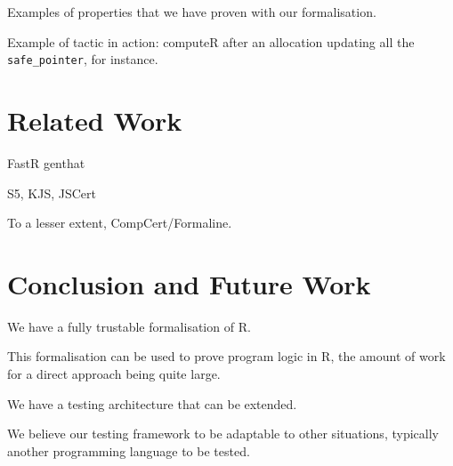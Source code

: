 \documentclass[
    sigplan,
    10pt,
    review, %
    natbib=false %
 ]{acmart}
\begin{document}
Examples of properties that we have proven with our formalisation.

Example of tactic in action:
computeR after an allocation updating all the \verb|safe_pointer|, for instance.

\section{Related Work}
\label{sec:related:work}

FastR
genthat

S5, KJS, JSCert

To a lesser extent, CompCert/Formaline.

\section{Conclusion and Future Work}
\label{sec:conclusion}

We have a fully trustable formalisation of R.

This formalisation can be used to prove program logic in R,
the amount of work for a direct approach being quite large.

We have a testing architecture that can be extended.

We believe our testing framework to be adaptable to other situations,
typically another programming language to be tested.

\printbibliography{}
\end{document}
